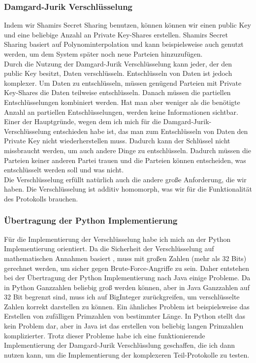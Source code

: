 \documentclass[a4paper,10pt]{scrartcl}
\begin{document}
\subsubsection{Damgard-Jurik Verschlüsselung}
Indem wir Shamirs Secret Sharing benutzen, können können wir einen public Key und eine beliebige Anzahl an Private Key-Shares erstellen. Shamirs Secret Sharing basiert auf Polynominterpolation und kann beispielsweise auch genutzt werden, um dem System später noch neue Parteien hinzuzufügen.\cite{Shamir1979}\\
Durch die Nutzung der Damgard-Jurik Verschlüsselung kann jeder, der den public Key besitzt, Daten verschlüsseln. Entschlüsseln von Daten ist jedoch komplexer. Um Daten zu entschlüsseln, müssen genügend Parteien mit Private Key-Shares die Daten teilweise entschlüsseln. Danach müssen die partiellen Entschlüsselungen kombiniert werden. Hat man aber weniger als die benötigte Anzahl an partiellen Entschlüsselungen, werden keine Informationen sichtbar. \cite{IvanDamgard2004}\\
Einer der Hauptgründe, wegen dem ich mich für die Damgard-Jurik-Verschlüsselung entschieden habe ist, das man zum Entschlüsseln von Daten den Private Key nicht wiederherstellen muss. Dadurch kann der Schlüssel nicht missbraucht werden, um auch andere Dinge zu entschlüsseln. Dadurch müssen die Parteien keiner anderen Partei trauen und die Parteien können entscheiden, was entschlüsselt werden soll und was nicht. \cite{IvanDamgard2004}\\
Die Verschlüsselung erfüllt natürlich auch die andere große Anforderung, die wir haben. Die Verschlüsselung ist additiv homomorph, was wir für die Funktionalität des Protokolls brauchen. \cite{IvanDamgard2004}

\subsubsection{Übertragung der Python Implementierung}
Für die Implementierung der Verschlüsselung habe ich mich an der Python Implementierung \cite{swansonk14} orientiert. Da die Sicherheit der Verschlüsselung auf mathematischen Annahmen basiert  \cite{10.1007/3-540-48910-X_16}, muss mit großen Zahlen (mehr als 32 Bits) gerechnet werden, um sicher gegen Brute-Force-Angriffe zu sein. Daher entstehen bei der Übertragung der Python Implementierung nach Java einige Probleme. Da in Python Ganzzahlen beliebig groß werden können, aber in Java Ganzzahlen auf 32 Bit begrenzt sind, muss ich auf BigInteger zurückgreifen, um verschlüsselte Zahlen korrekt darstellen zu können.
Ein ähnliches Problem ist beispielsweise das Erstellen von zufälligen Primzahlen von bestimmter Länge. In Python stellt das kein Problem dar, aber in Java ist das erstellen von beliebig langen Primzahlen komplizierter. Trotz dieser Probleme habe ich eine funktionierende Implementierung der Damgard-Jurik Verschlüsslung geschaffen, die ich dann nutzen kann, um die Implementierung der komplexeren Teil-Protokolle zu testen.
\end{document}
